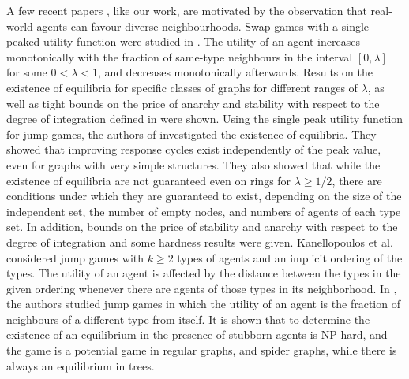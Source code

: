  A few recent papers  \cite{ijcai2022p12,friedrich2023single,kanellopoulos2023tolerance,NS23},
like our work, are motivated by the observation that real-world agents 
can favour diverse neighbourhoods. Swap games with a single-peaked utility function were studied in \cite{ijcai2022p12}. The utility of an agent  increases monotonically with the fraction of
 same-type neighbours in the interval $[0, \lambda]$ for some $0<\lambda<1$, and decreases monotonically afterwards. Results on the existence of equilibria for specific classes of graphs for different ranges of $\lambda$, as well as tight bounds on the price of anarchy and stability with respect to the degree of integration defined in \cite{agarwal2020swap} were shown. 
Using the  single peak utility function for jump games, the authors of \cite{friedrich2023single} investigated the existence of equilibria. 
They showed that improving response cycles exist independently of the peak value,
 even for graphs with very simple structures. They also showed that while the existence of equilibria are not guaranteed  even on rings for $\lambda\geq 1/2$, there are  conditions under which they are guaranteed to exist, depending on the size  of the independent set, the number of empty nodes, and numbers of agents of each type set.
In addition, bounds on the price of stability and anarchy with respect to the degree of integration and some hardness results were given. 
Kanellopoulos et al. \cite{kanellopoulos2023tolerance} considered jump games with $k \geq 2$ types of agents and  an implicit ordering of the types.  The utility of an agent is affected by the distance between the types in the given ordering  whenever there are agents of those types in its neighborhood. 
In \cite{Narayanan2023diversityb}, the authors studied jump games in which the utility of an agent is the fraction of neighbours of a different type from itself.  It is shown that  to determine the existence of an equilibrium in the presence of stubborn agents is NP-hard, and the game is a potential game in regular graphs, and spider graphs, while there is always an equilibrium in trees.  











